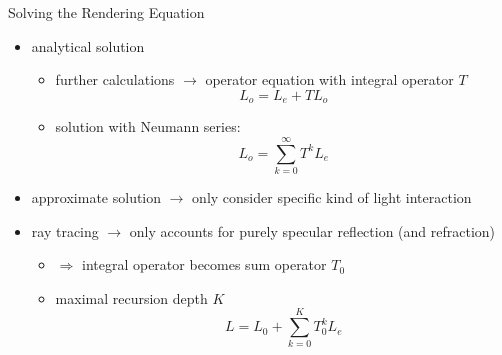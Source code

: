 \begin{frame}{Solving the Rendering Equation}
\begin{itemize}
\item analytical solution 
\begin{itemize}
\pause
\item  further calculations $\rightarrow$ operator equation with integral operator $T$
\begin{equation}
    L_o = L_e + TL_o
\end{equation}
\pause
\item solution with Neumann series: 
\begin{equation}
    L_o = \sum_{k= 0}^{\infty} T^k L_e
\end{equation}
\end{itemize}
\pause
\item approximate solution $\rightarrow$ only consider specific kind of light interaction
\pause
\item ray tracing $\rightarrow$ only accounts for purely specular reflection (and refraction)
\begin{itemize}
    \pause
    \item  $\Rightarrow$ integral operator becomes sum operator 
    $T_0$
    \pause
    \item maximal recursion depth $K$
\begin{equation}
     L = L_0 + \sum_{k= 0}^{K} T_0^k L_e
\end{equation}
\end{itemize}
\end{itemize}
\end{frame}

